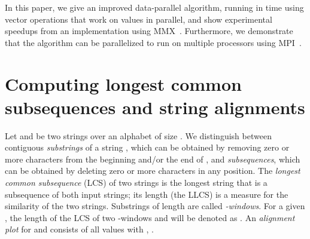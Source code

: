 \documentclass{IOS-Book-Article}     \usepackage{amsmath}
\theoremstyle{plain}
\theoremstyle{definition}
\begin{document}
In this paper, we give an improved data-parallel algorithm, running in time
 using vector operations that work on  values in
parallel, and show experimental speedups from an implementation using
MMX~\cite{Intel:09}. Furthermore, we demonstrate that the algorithm can be
parallelized to run on multiple processors using MPI~\cite{Snir+:95}.

\section{Computing longest common subsequences and string
alignments}\label{sec:lcs} 
Let  and  be two strings over an alphabet  of size . We distinguish between contiguous
\textit{substrings} of a string , which can be obtained by removing zero or
more characters from the beginning and/or the end of , and \textit{subsequences},
which can be obtained by deleting zero or more characters in any position.
The \textit{longest common subsequence} (LCS) of two strings is the longest
string that is a subsequence of both input strings; its length (the LLCS) is a
measure for the similarity of the two strings.
Substrings of length  are called \textit{-windows}.
For a given , the length of the LCS of two -windows 
and  will be denoted as . 
An \textit{alignment plot} for  and  consists of all values
 with , .
\end{document}
